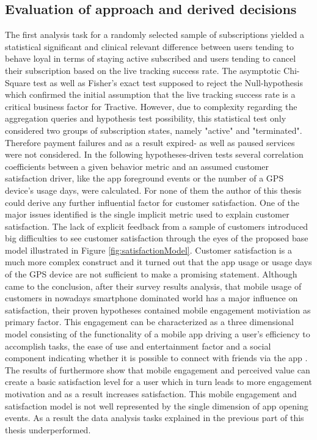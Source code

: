 \subsection{Evaluation of approach and derived decisions}
The first analysis task for a randomly selected sample of subscriptions yielded a statistical significant and clinical relevant difference between users tending to behave loyal in terms of staying active subscribed and users tending to cancel their subscription based on the live tracking success rate. The asymptotic Chi-Square test as well as Fisher's exact test supposed to reject the Null-hypothesis which confirmed the initial assumption that the live tracking success rate is a critical business factor for Tractive. However, due to complexity regarding the aggregation queries and hypothesis test possibility, this statistical test only considered two groups of subscription states, namely "active" and "terminated". Therefore payment failures and as a result expired- as well as paused services were not considered. In the following hypotheses-driven tests several correlation coefficients between a given behavior metric and an assumed customer satisfaction driver, like the app foreground events or the number of a GPS device's usage days, were calculated. For none of them the author of this thesis could derive any further influential factor for customer satisfaction. One of the major issues identified is the single implicit metric used to explain customer satisfaction. The lack of explicit feedback from a sample of customers introduced big difficulties to see customer satisfaction through the eyes of the proposed base model illustrated in Figure \ref{fig:satisfactionModel}. Customer satisfaction is a much more complex construct and it turned out that the app usage or usage days of the GPS device are not sufficient to make a promising statement. Although \cite{kim2013study} came to the conclusion, after their survey results analysis, that mobile usage of customers in nowadays smartphone dominated world has a major influence on satisfaction, their proven hypotheses contained mobile engagement motiviation as primary factor. This engagement can be characterized as a three dimensional model consisting of the functionality of a mobile app driving a user's efficiency to accomplish tasks, the ease of use and entertainment factor and a social component indicating whether it is possible to connect with friends via the app \cite{VARNALI2010144}. The results of \cite{kim2013study} furthermore show that mobile engagement and perceived value can create a basic satisfaction level for a user which in turn leads to more engagement motivation and as a result increases satisfaction. This mobile engagement and satisfaction model is not well represented by the single dimension of app opening events. As a result the data analysis tasks explained in the previous part of this thesis underperformed.

